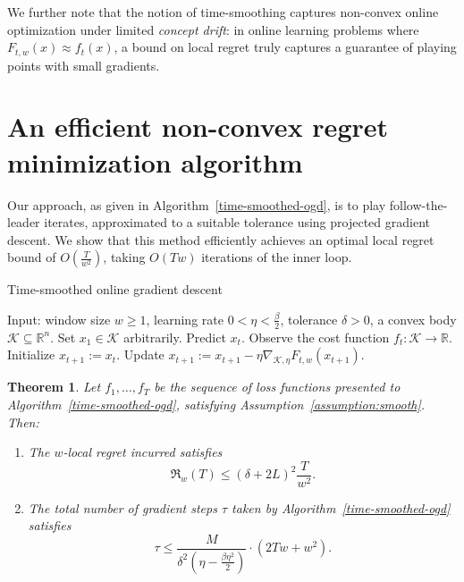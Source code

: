 \documentclass{article}
\def\reals{{\mathbb R}}
\def\norm#1{\mathopen\| #1 \mathclose\|}
\def\reals{{\mathbb R}}
\newcommand{\K}{\ensuremath{\mathcal K}}
\newcommand{\pa}[1]{\left(#1\right)}
\newtheorem{theorem}{Theorem}[section]
\renewcommand{\K}{\mathcal{K}}
\newcommand{\regret}{\mathfrak{R}}
\begin{document}
We further note that the notion of time-smoothing captures non-convex online optimization under limited \emph{concept drift}: in online learning problems where $F_{t,w}(x) \approx f_t(x)$, a bound on local regret truly captures a guarantee of playing points with small gradients. 
\section{An efficient non-convex regret minimization algorithm}

Our approach, as given in Algorithm~\ref{time-smoothed-ogd}, is to play follow-the-leader iterates, approximated to a suitable tolerance using projected gradient descent. We show that this method efficiently achieves an optimal local regret bound of $O\pa{ \frac{T}{w^2} }$, taking $O\pa{Tw}$ iterations of the inner loop.

\begin{algorithm}
\caption{Time-smoothed online gradient descent}
\label{time-smoothed-ogd}
\begin{algorithmic}[1]
\STATE Input: window size $w \geq 1$, learning rate $0 < \eta < \frac{\beta}{2}$, tolerance $\delta > 0$, a convex body $\K\subseteq \reals^n$.
\STATE Set $x_1 \in \K$ arbitrarily.
\STATE Predict $x_t$. Observe the cost function $f_t:\K\to \reals$.
\STATE Initialize $x_{t+1} := x_t$.
\WHILE{ $\norm{ \nabla_{\K,\eta} F_{t,w} (x_{t+1}) } > \delta/w$ }
\STATE Update $x_{t+1} := x_{t+1} - \eta \nabla_{\K,\eta} F_{t,w} (x_{t+1})$.
\ENDWHILE
\ENDFOR
\end{algorithmic}
\end{algorithm}

\begin{theorem}
\label{thm:onco-first}
Let $f_1, \ldots, f_T$ be the sequence of loss functions presented to Algorithm~\ref{time-smoothed-ogd}, satisfying Assumption~\ref{assumption:smooth}. Then:
\begin{enumerate}
\item[(i)] The $w$-local regret incurred satisfies \[\regret_w(T) \leq \pa{\delta + 2L}^2 \frac{T}{w^2}.\]
\item[(ii)] The total number of gradient steps $\tau$ taken by Algorithm~\ref{time-smoothed-ogd} satisfies \[\tau \leq \frac{M}{\delta^2 \pa{\eta - \frac{\beta \eta^2}{2}}} \cdot \pa{2Tw + w^2}.\]
\end{enumerate}
\end{theorem}
\end{document}
